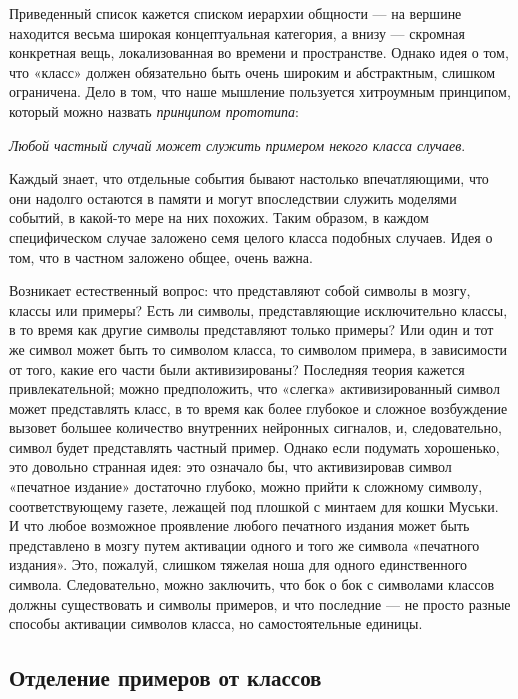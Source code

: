 \documentclass[../main.tex]{subfiles}
\begin{document}
Приведенный список кажется списком иерархии общности --- на вершине находится весьма широкая концептуальная категория, а внизу --- скромная конкретная вещь, локализованная во времени и пространстве. Однако идея о том, что «класс» должен обязательно быть очень широким и абстрактным, слишком ограничена. Дело в том, что наше мышление пользуется хитроумным принципом, который можно назвать \emph{принципом прототипа}:

\emph{Любой частный случай может служить примером некого класса случаев}.

Каждый знает, что отдельные события бывают настолько впечатляющими, что они надолго остаются в памяти и могут впоследствии служить моделями событий, в какой-то мере на них похожих. Таким образом, в каждом специфическом случае заложено семя целого класса подобных случаев. Идея о том, что в частном заложено общее, очень важна.

Возникает естественный вопрос: что представляют собой символы в мозгу, классы или примеры? Есть ли символы, представляющие исключительно классы, в то время как другие символы представляют только примеры? Или один и тот же символ может быть то символом класса, то символом примера, в зависимости от того, какие его части были активизированы? Последняя теория кажется привлекательной; можно предположить, что «слегка» активизированный символ может представлять класс, в то время как более глубокое и сложное возбуждение вызовет большее количество внутренних нейронных сигналов, и, следовательно, символ будет представлять частный пример. Однако если подумать хорошенько, это довольно странная идея: это означало бы, что активизировав символ «печатное издание» достаточно глубоко, можно прийти к сложному символу, соответствующему газете, лежащей под плошкой с минтаем для кошки Муськи. И что любое возможное проявление любого печатного издания может быть представлено в мозгу путем активации одного и того же символа «печатного издания». Это, пожалуй, слишком тяжелая ноша для одного единственного символа. Следовательно, можно заключить, что бок о бок с символами классов должны существовать и символы примеров, и что последние --- не просто разные способы активации символов класса, но самостоятельные единицы.

\subsection{Отделение примеров от классов}
\end{document}
